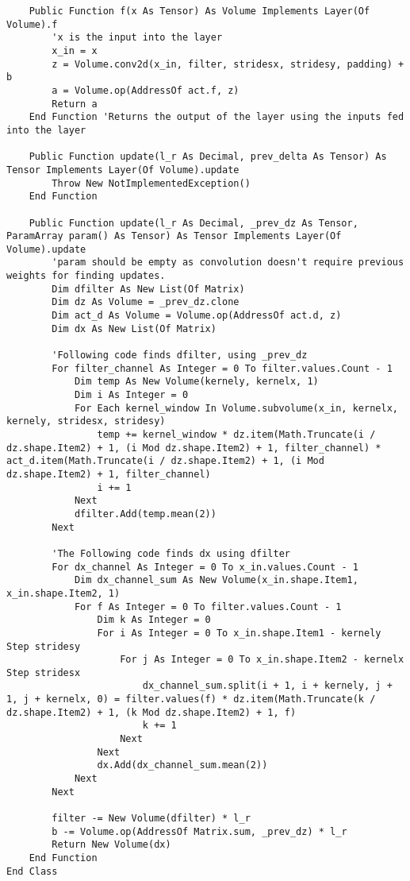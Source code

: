 \begin{verbatim}
    Public Function f(x As Tensor) As Volume Implements Layer(Of Volume).f
        'x is the input into the layer
        x_in = x
        z = Volume.conv2d(x_in, filter, stridesx, stridesy, padding) + b
        a = Volume.op(AddressOf act.f, z)
        Return a
    End Function 'Returns the output of the layer using the inputs fed into the layer

    Public Function update(l_r As Decimal, prev_delta As Tensor) As Tensor Implements Layer(Of Volume).update
        Throw New NotImplementedException()
    End Function

    Public Function update(l_r As Decimal, _prev_dz As Tensor, ParamArray param() As Tensor) As Tensor Implements Layer(Of Volume).update
        'param should be empty as convolution doesn't require previous weights for finding updates.
        Dim dfilter As New List(Of Matrix)
        Dim dz As Volume = _prev_dz.clone
        Dim act_d As Volume = Volume.op(AddressOf act.d, z)
        Dim dx As New List(Of Matrix)

        'Following code finds dfilter, using _prev_dz
        For filter_channel As Integer = 0 To filter.values.Count - 1
            Dim temp As New Volume(kernely, kernelx, 1)
            Dim i As Integer = 0
            For Each kernel_window In Volume.subvolume(x_in, kernelx, kernely, stridesx, stridesy)
                temp += kernel_window * dz.item(Math.Truncate(i / dz.shape.Item2) + 1, (i Mod dz.shape.Item2) + 1, filter_channel) * act_d.item(Math.Truncate(i / dz.shape.Item2) + 1, (i Mod dz.shape.Item2) + 1, filter_channel)
                i += 1
            Next
            dfilter.Add(temp.mean(2))
        Next

        'The Following code finds dx using dfilter
        For dx_channel As Integer = 0 To x_in.values.Count - 1
            Dim dx_channel_sum As New Volume(x_in.shape.Item1, x_in.shape.Item2, 1)
            For f As Integer = 0 To filter.values.Count - 1
                Dim k As Integer = 0
                For i As Integer = 0 To x_in.shape.Item1 - kernely Step stridesy
                    For j As Integer = 0 To x_in.shape.Item2 - kernelx Step stridesx
                        dx_channel_sum.split(i + 1, i + kernely, j + 1, j + kernelx, 0) = filter.values(f) * dz.item(Math.Truncate(k / dz.shape.Item2) + 1, (k Mod dz.shape.Item2) + 1, f)
                        k += 1
                    Next
                Next
                dx.Add(dx_channel_sum.mean(2))
            Next
        Next

        filter -= New Volume(dfilter) * l_r
        b -= Volume.op(AddressOf Matrix.sum, _prev_dz) * l_r
        Return New Volume(dx)
    End Function
End Class
\end{verbatim}